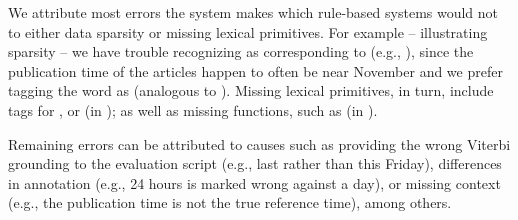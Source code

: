 We attribute most errors the system makes which rule-based systems would not
	to either data sparsity or missing lexical primitives.
For example -- illustrating sparsity -- we have trouble recognizing  as corresponding
	to  (e.g., ), since the publication time of the articles happen to
	often be near November and we prefer tagging the word as  (analogous to 
	).
Missing lexical primitives, in turn, include tags for , or 
	(in ); as well as missing functions, such as
	 (in ).

Remaining errors can be attributed to causes such as providing the wrong Viterbi grounding
	to the evaluation script (e.g., last rather than this Friday), differences in 
	annotation (e.g., 24 hours is marked wrong against a day), or missing context 
	(e.g., the publication time is not the true reference time), among others.
